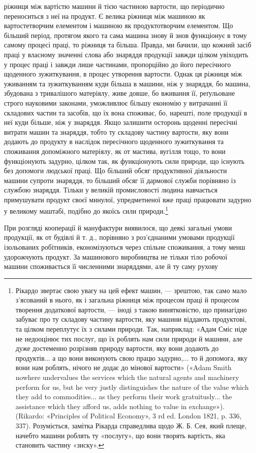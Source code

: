 \parcont{}  %
ріжниця між вартістю машини й тією частиною вартости, що
періодично переноситься з неї на продукт. Є велика ріжниця між
машиною як вартостетворчим елементом і машиною як продуктотворчим
елементом. Що більший період, протягом якого та сама
машина знову й знов функціонує в тому самому процесі праці,
то ріжниця та більша. Правда, ми бачили, що кожний засіб праці
у власному значенні слова або знаряддя продукції завжди цілком
увіходить у процес праці і завжди лише частинами, пропорційно
до його пересічного щоденного зужиткування, в процес утворення
вартости. Однак ця ріжниця між уживанням та зужиткуванням
куди більша в машини, ніж у знаряддя, бо машина, збудована
з тривалішого матеріялу, живе довше, бо вживання її, реґульоване
строго науковими законами, уможливлює більшу економію
у витрачанні її складових частин та засобів, що їх вона споживає,
бо, нарешті, поле продукції в неї куди більше, ніж у знаряддя.
Якщо залишити осторонь щоденні пересічні витрати машин та
знаряддя, тобто ту складову частину вартости, яку вони додають
до продукту в наслідок пересічного щоденного зужиткування
та споживання допоміжного матеріялу, як от мастива, вугілля
тощо, то вони функціонують задурно, цілком так, як функціонують
сили природи, що існують без допомоги людської праці.
Що більший обсяг продуктивної діяльности машини супроти
знаряддя, то більший обсяг її дармової служби порівняно із
службою знаряддя. Тільки у великій промисловості людина
навчається примушувати продукт своєї минулої, упредметненої
вже праці працювати задурно у великому маштабі, подібно до
якоїсь сили природи.\footnote{
Рікардо звертає свою увагу на цей ефект машин, — зрештою,
так само мало з’ясований в нього, як і загальна ріжниця між процесом
праці й процесом творення додаткової вартости, — іноді з такою винятковістю,
що принагідно забуває про ту складову частину вартости, яку
машини віддають продуктові, та цілком переплутує їх з силами природи.
Так, наприклад: «Адам Сміс ніде не недооцінює тих послуг, що їх роблять
нам сили природи й машини, але дуже достеменно розрізняв природу
вартости, яку вони додають до продуктів... а що вони виконують свою
працю задурно,... то й допомога, яку вони нам роблять, нічого не додає
до мінової вартости» («Adam Smith nowhere undervalues the services
which the natural agents and machinery perform for us, but he very justly
distinguishes the nature of the value which they add to commodities... as
they perform their work gratuitusly... the assistance which they afford
us, adds nothing to value in exchange»). (Rikardo: «Principles of
Political Economy», 3 rd ed. London 1821, p. 336, 337). Розуміється,
замітка Рікарда справедлива щодо Ж. Б. Сея, який плеще, начебто машини
роблять ту «послугу», що вони творять вартість, яка становить
частину «зиску».
}

При розгляді кооперації й мануфактури виявилося, що деякі
загальні умови продукції, як от будівлі й т. д., порівняно з роз’єднаними
умовами продукції ізольованих робітників, економізуються
через спільне споживання, а тому менш удорожчують продукт.
За машинового виробництва не тільки тіло робочої машини
споживається її численними знаряддями, але й ту саму рухову
\parbreak{}  %
